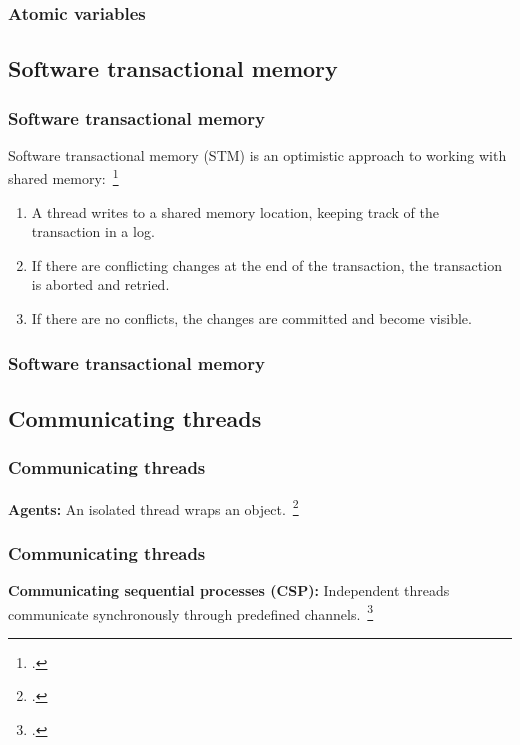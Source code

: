\documentclass[aspectratio=1610]{beamer}
\begin{document}
  \begin{frame}
    \frametitle{Atomic variables}
    \centering
    
  \end{frame}

  \subsection{Software transactional memory}

  \begin{frame}
    \frametitle{Software transactional memory}

    Software transactional memory (STM) is an optimistic approach to working with shared memory:~\footcite{Shavit1995}

    \begin{enumerate}
      \item A thread writes to a shared memory location, keeping track of the transaction in a log.
      \item If there are conflicting changes at the end of the transaction, the transaction is aborted and retried.
      \item If there are no conflicts, the changes are committed and become visible.
    \end{enumerate}
  \end{frame}

  \begin{frame}
    \frametitle{Software transactional memory}
    \centering
    
  \end{frame}

  \subsection{Communicating threads}

  \begin{frame}
    \frametitle{Communicating threads}
    \centering
    
    \vfill
    \textbf{Agents:} An isolated thread wraps an object.~\footcite{Swalens2014}
  \end{frame}

  \begin{frame}
    \frametitle{Communicating threads}
    \centering
    
    \vfill
    \textbf{Communicating sequential processes (CSP):} Independent threads communicate synchronously through predefined channels.~\footcite{Hoare1978}
  \end{frame}
\end{document}
